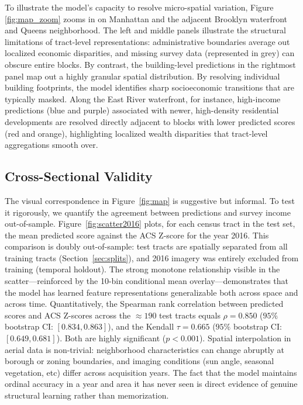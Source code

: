 \documentclass[conference]{IEEEtran}
\begin{document}
To illustrate the model's capacity to resolve micro-spatial variation, Figure \ref{fig:map_zoom} zooms in on Manhattan and the adjacent Brooklyn waterfront and Queens neighborhood. The left and middle panels illustrate the structural limitations of tract-level representations: administrative boundaries average out localized economic disparities, and missing survey data (represented in grey) can obscure entire blocks. By contrast, the building-level predictions in the rightmost panel map out a highly granular spatial distribution. By resolving individual building footprints, the model identifies sharp socioeconomic transitions that are typically masked. Along the East River waterfront, for instance, high-income predictions (blue and purple) associated with newer, high-density residential developments are resolved directly adjacent to blocks with lower predicted scores (red and orange), highlighting localized wealth disparities that tract-level aggregations smooth over.


\subsection{Cross-Sectional Validity}

The visual correspondence in Figure~\ref{fig:map} is suggestive but informal. To test it rigorously, we quantify the agreement between predictions and survey income out-of-sample. Figure~\ref{fig:scatter2016} plots, for each census tract in the test set, the mean predicted score against the ACS Z-score for the year 2016. This comparison is doubly out-of-sample: test tracts are spatially separated from all training tracts (Section~\ref{sec:splits}), and 2016 imagery was entirely excluded from training (temporal holdout). The strong monotone relationship visible in the scatter---reinforced by the 10-bin conditional mean overlay---demonstrates that the model has learned feature representations generalizable both across space and across time. Quantitatively, the Spearman rank correlation between predicted scores and ACS Z-scores across the $\approx 190$ test tracts equals $\rho = 0.850$ ($95\%$ bootstrap CI: $[0.834, 0.863]$), and the Kendall $\tau = 0.665$ ($95\%$ bootstrap CI: $[0.649, 0.681]$). Both are highly significant ($p < 0.001$). Spatial interpolation in aerial data is non-trivial: neighborhood characteristics can change abruptly at borough or zoning boundaries, and imaging conditions (sun angle, seasonal vegetation, etc) differ across acquisition years. The fact that the model maintains ordinal accuracy in a year and area it has never seen is direct evidence of genuine structural learning rather than memorization.
\end{document}
